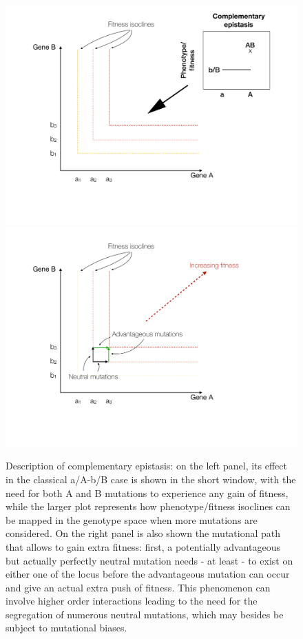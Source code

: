 \begin{figure}[h!]
    \centering
    \includegraphics[scale=0.285,trim=3.2cm 4cm 3.2cm 1cm,clip]{pics/Epistasis/Complementary epistasis.pdf}
    \includegraphics[scale=0.285,trim=3.2cm 4cm 6cm 1cm,clip]{pics/Epistasis/Complementary epistasis_EvoTraj.pdf}
    \caption{Description of complementary epistasis: on the left panel, its effect in the classical a/A-b/B case is shown in the short window, with the need for both A and B mutations to experience any gain of fitness, while the larger plot represents how phenotype/fitness isoclines can be mapped in the genotype space when more mutations are considered. On the right panel is also shown the mutational path that allows to gain extra fitness: first, a potentially advantageous but actually perfectly neutral mutation needs - at least - to exist on either one of the locus before the advantageous mutation can occur and give an actual extra push of fitness. This phenomenon can involve higher order interactions leading to the need for the segregation of numerous neutral mutations, which may besides be subject to mutational biases.}
    \label{fig:ComplementaryEpi}
\end{figure}

